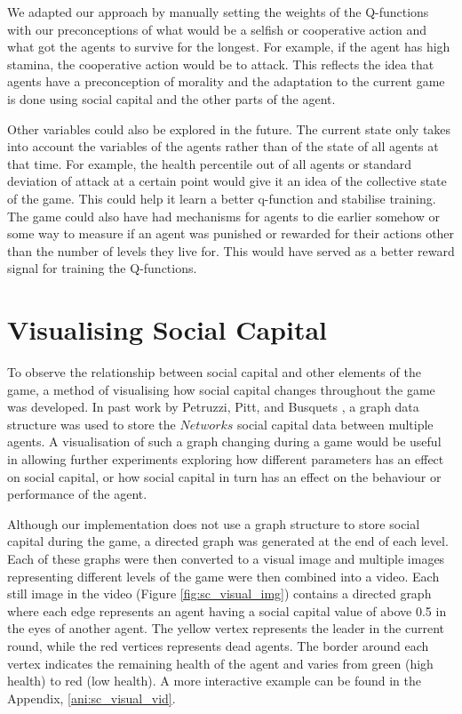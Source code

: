 We adapted our approach by manually setting the weights of the Q-functions with our preconceptions of what would be a selfish or cooperative action and what got the agents to survive for the longest. For example, if the agent has high stamina, the cooperative action would be to attack. This reflects the idea that agents have a preconception of morality and the adaptation to the current game is done using social capital and the other parts of the agent.

Other variables could also be explored in the future. The current state only takes into account the variables of the agents rather than of the state of all agents at that time. For example, the health percentile out of all agents or standard deviation of attack at a certain point would give it an idea of the collective state of the game. This could help it learn a better q-function and stabilise training. The game could also have had mechanisms for agents to die earlier somehow or some way to measure if an agent was punished or rewarded for their actions other than the number of levels they live for. This would have served as a better reward signal for training the Q-functions.

\section{Visualising Social Capital}

To observe the relationship between social capital and other elements of the game, a method of visualising how social capital changes throughout the game was developed. In past work by Petruzzi, Pitt, and Busquets \cite{electronic_social_capital}, a graph data structure was used to store the $Networks$ social capital data between multiple agents. A visualisation of such a graph changing during a game would be useful in allowing further experiments exploring how different parameters has an effect on social capital, or how social capital in turn has an effect on the behaviour or performance of the agent. 

Although our implementation does not use a graph structure to store social capital during the game, a directed graph was generated at the end of each level. Each of these graphs were then converted to a visual image and multiple images representing different levels of the game were then combined into a video. Each still image in the video (Figure \ref{fig:sc_visual_img}) contains a directed graph where each edge represents an agent having a social capital value of above 0.5 in the eyes of another agent. The yellow vertex represents the leader in the current round, while the red vertices represents dead agents. The border around each vertex indicates the remaining health of the agent and varies from green (high health) to red (low health). A more interactive example can be found in the Appendix, \ref{ani:sc_visual_vid}.

